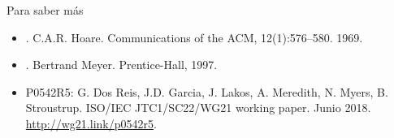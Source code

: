 \begin{frame}[t]{Para saber más}
\begin{itemize}
  \item {}.
        C.A.R. Hoare.
        Communications of the ACM, 12(1):576--580.
        1969.

  \vfill
  \item {}.
        Bertrand Meyer.
        Prentice-Hall, 1997.

  \vfill
  \item P0542R5: 
        G. Dos Reis, J.D. Garcia, J. Lakos, A. Meredith, N. Myers, B. Stroustrup.
        ISO/IEC JTC1/SC22/WG21 working paper. Junio 2018.
        \url{http://wg21.link/p0542r5}.
\end{itemize}
\end{frame}
